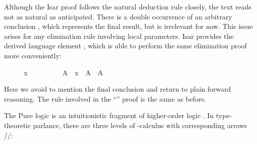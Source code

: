 \begin{isabellebody}
\begin{minipage}{0.4\textwidth}
\begin{isamarkuptext}
\end{isamarkuptext}%
\isamarkuptrue%
%
\end{minipage}
%
\begin{isamarkuptext}%
\medskip\noindent Although the Isar proof follows the natural
  deduction rule closely, the text reads not as natural as
  anticipated.  There is a double occurrence of an arbitrary
  conclusion , which represents the final result, but is
  irrelevant for now.  This issue arises for any elimination rule
  involving local parameters.  Isar provides the derived language
  element \hyperlink{command.obtain}{\mbox{}}, which is able to perform the same
  elimination proof more conveniently:%
\end{isamarkuptext}%
\isamarkuptrue%
%
\isadelimproof
%
\endisadelimproof
%
\isatagproof
\ \ \ \ \isamarkupfalse%
\ {\isachardoublequoteopen}x\ {\isasymin}\ {\isasymUnion}{\isasymA}{\isachardoublequoteclose}\isanewline
\ \ \ \ \isamarkupfalse%
\ \isamarkupfalse%
\ A\ \ {\isachardoublequoteopen}x\ {\isasymin}\ A{\isachardoublequoteclose}\ \ {\isachardoublequoteopen}A\ {\isasymin}\ {\isasymA}{\isachardoublequoteclose}\ \isacommand{{\isachardot}{\isachardot}}\isamarkupfalse%
%
\endisatagproof
{\isafoldproof}%
%
\isadelimproof
%
\endisadelimproof
%
\begin{isamarkuptext}%
\noindent Here we avoid to mention the final conclusion 
  and return to plain forward reasoning.  The rule involved in the
  ``\hyperlink{command.ddot}{\mbox{\isa{\isacommand{{\isachardot}{\isachardot}}}}}'' proof is the same as before.%
\end{isamarkuptext}%
\isamarkuptrue%
%
\isamarkuptrue%
%
\begin{isamarkuptext}%
The Pure logic \cite{paulson-found,paulson700} is an intuitionistic
  fragment of higher-order logic \cite{church40}.  In type-theoretic
  parlance, there are three levels of \isa{{\isachardoublequote}{\isasymlambda}{\isachardoublequote}}-calculus with
  corresponding arrows \isa{{\isachardoublequote}{\isasymRightarrow}{\isachardoublequote}}/\isa{{\isachardoublequote}{\isasymAnd}{\isachardoublequote}}/\isa{{\isachardoublequote}{\isasymLongrightarrow}{\isachardoublequote}}:


\end{isamarkuptext}
\end{isabellebody}
